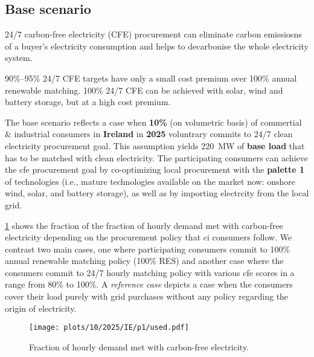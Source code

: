 \subsection{Base scenario}
\label{subsec:base}

\vspace{10pt}
\begin{res}
    24/7 carbon-free electricity (CFE) procurement can eliminate carbon emissiosns of a buyer's electricity consumption and helps to decarbonise the whole electricity system.
\end{res}

\vspace{5pt}
\begin{res}
    90\%--95\% 24/7 CFE targets have only a small cost premium over 100\% annual renewable matching. 100\% 24/7 CFE can be achieved with solar, wind and battery storage, but at a high cost premium.
\end{res}


The base scenario reflects a case when \textbf{10\%} (on volumetric basis) of commertial \& industrial consumers in \textbf{Ireland} in \textbf{2025} voluntrary commits to 24/7 clean electricity procurement goal.
This assumption yields 220~MW of \textbf{base load} that has to be matched with clean electricity. 
The participating consumers can achieve the \gls{cfe} procurement goal by co-optimizing local procurement with the \textbf{palette 1} of technologies (i.e., mature technologies available on the market now: onshore wind, solar, and battery storage), as well as by importing electrcity from the local grid.

\cref{fig:10-2025-IE-p1-used} shows the fraction of the fraction of hourly demand met with carbon-free electricity depending on the procurement policy that \gls{ci} consumers follow.
We contrast two main cases, one where participating consumers commit to 100\% annual renewable matching policy (100\% RES) and another case where the consumers commit to 24/7 hourly matching policy with various \gls{cfe} scores in a range from 80\% to 100\%. 
A \textit{reference case} depicts a case when the consumers cover their load purely with grid purchases without any policy regarding the origin of electricity.

\begin{figure}
    \centering
    \texttt{[image: plots/10/2025/IE/p1/used.pdf]}
    \caption{Fraction of hourly demand met with carbon-free electricity.}
    \label{fig:10-2025-IE-p1-used}
\end{figure}

